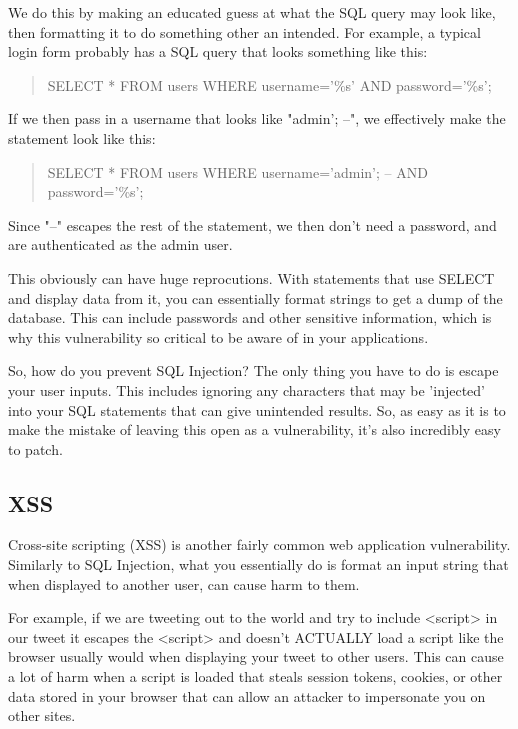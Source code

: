 \documentclass[12pt]{article}
\begin{document}
We do this by making an educated guess at what the SQL query may look like,
then formatting it to do something other an intended. For example, a typical
login form probably has a SQL query that looks something like this:

\begin{quote}
    SELECT * FROM users WHERE username='\%s' AND password='\%s';
\end{quote}

If we then pass in a username that looks like "admin'; --", we effectively
make the statement look like this:

\begin{quote}
    SELECT * FROM users WHERE username='admin'; -- AND password='\%s';
\end{quote}

Since "--" escapes the rest of the statement, we then don't need a password,
and are authenticated as the admin user.

This obviously can have huge reprocutions. With statements that use SELECT and
display data from it, you can essentially format strings to get a dump of the
database. This can include passwords and other sensitive information, which
is why this vulnerability so critical to be aware of in your applications.

So, how do you prevent SQL Injection? The only thing you have to do is escape
your user inputs. This includes ignoring any characters that may be 'injected'
into your SQL statements that can give unintended results. So, as easy as it
is to make the mistake of leaving this open as a vulnerability, it's also
incredibly easy to patch.

\subsection{XSS}

Cross-site scripting (XSS) is another fairly common web application
vulnerability. Similarly to SQL Injection, what you essentially do is format
an input string that when displayed to another user, can cause harm to them.

For example, if we are tweeting out to the world and try to include <script>
in our tweet it escapes the <script> and doesn't ACTUALLY load a script
like the browser usually would when displaying your tweet to other users. This
can cause a lot of harm when a script is loaded that steals session tokens,
cookies, or other data stored in your browser that can allow an attacker to
impersonate you on other sites. 
\end{document}

